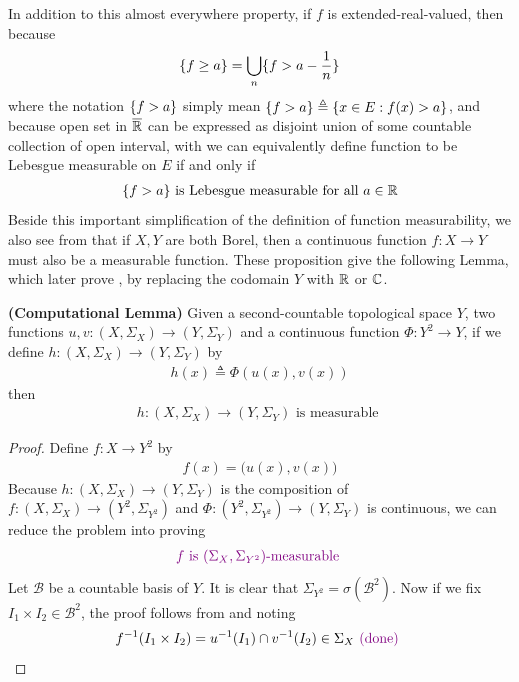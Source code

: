 \documentclass{report}
\begin{document}
\begin{mdframed}
In addition to this almost everywhere property, if $f$ is extended-real-valued, then because 
\begin{align*}
  \{ f\geq  a \}= \bigcup_n \{ f > a-\frac{1}{n} \}
\end{align*}
where the notation $\{ f>a \}$ simply mean $\{ f>a \}\triangleq \{ x\in E: f(x)>a \}$, and because open set in $\overline{\mathbb{R}}$ can be expressed as disjoint union of some countable collection of open interval, with  we can equivalently define function to be Lebesgue measurable on $E$ if and only if 
\begin{align*}
\{ f>a \}\text{ is Lebesgue measurable for all }a\in\mathbb{R}
\end{align*}
Beside this important simplification of the definition of function measurability, we also see from  that if $X,Y$ are both Borel, then a continuous function  $f:X\rightarrow Y$ must also be a measurable function. These proposition give the following Lemma, which later prove , by replacing the codomain $Y$ with $\mathbb{R}$ or $\mathbb{C}$. 
\end{mdframed}
\begin{lemma}
\label{CL}
\textbf{(Computational Lemma)} Given a second-countable topological space $Y$, two functions $u,v:(X,\Sigma_X)\rightarrow (Y,\Sigma_Y)$ and a continuous function $\Phi:Y^2 \rightarrow Y$, if we define $h:(X,\Sigma_X)\rightarrow (Y,\Sigma_Y)$ by
\begin{align*}
h(x)\triangleq \Phi(u(x),v(x))
\end{align*}
then  
\begin{align*}
h:(X,\Sigma_X)\rightarrow (Y,\Sigma_Y)\text{ is measurable }
\end{align*}
\end{lemma}
\begin{proof}
Define $f:X\rightarrow Y^2$ by 
\begin{align*}
f(x)=\big(u(x),v(x) \big)
\end{align*}
Because $h:(X,\Sigma_X)\rightarrow (Y,\Sigma_Y)$ is the composition of $f:(X,\Sigma_X)\rightarrow (Y^2 ,\Sigma_{Y^2})$ and $\Phi:(Y^2 ,\Sigma_{Y^2})\rightarrow (Y,\Sigma_{Y})$ is continuous, we can reduce the problem into proving
\begin{align*}
\textcolor{violet}{f\text{ is $(\Sigma_X,\Sigma_{Y^2})$-measurable }}
\end{align*}
Let $\mathcal{B}$ be a countable basis of $Y$. It is clear that $\Sigma_{Y^2}=\sigma (\mathcal{B}^2)$. Now if we fix $I_1\times I_2 \in \mathcal{B}^2$, the proof follows from  and noting 
\begin{align*}
f^{-1}(I_1\times I_2)=u^{-1}(I_1)\cap v^{-1}(I_2) \in \Sigma_X \textcolor{violet}{\text{ (done) }}
\end{align*}
\end{proof}
\end{document}
